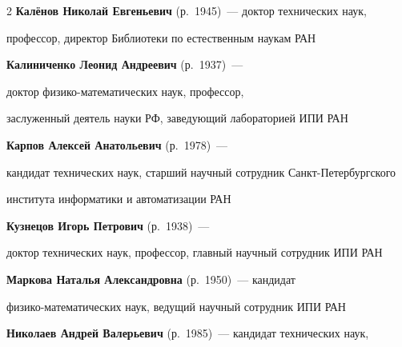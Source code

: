 \begin{multicols}{2}
\textbf{Калёнов Николай Евгеньевич} (р.\ 1945)~---  доктор технических наук,

профессор, директор Библиотеки по естественным наукам РАН



\vspace*{5pt}





\noindent

\textbf{Калиниченко Леонид Андреевич} (р.\ 1937)~--- 

доктор фи\-зи\-ко-математических  наук, профессор, 

заслуженный деятель науки РФ, за\-ве\-ду\-ющий лабораторией ИПИ РАН



\vspace*{5pt}





\noindent

\textbf{Карпов Алексей Анатольевич} (р.\ 1978)~--- 

кандидат технических наук, старший научный сотрудник Санкт-Пе\-тер\-бург\-ско\-го

института информатики и автоматизации РАН



\vspace*{5pt}



\noindent

\textbf{Кузнецов Игорь Петрович} (р.\ 1938)~--- 

доктор технических наук, профессор, главный научный сотрудник ИПИ РАН



\vspace*{5pt}



\noindent

\textbf{Маркова Наталья Александровна} (р.\ 1950)~--- кандидат

фи\-зи\-ко-ма\-те\-ма\-ти\-че\-ских наук,  ведущий научный сотрудник ИПИ РАН



\columnbreak






\noindent

\textbf{Николаев Андрей Валерьевич} (р.\ 1985)~--- кандидат технических наук, 


\end{multicols}
